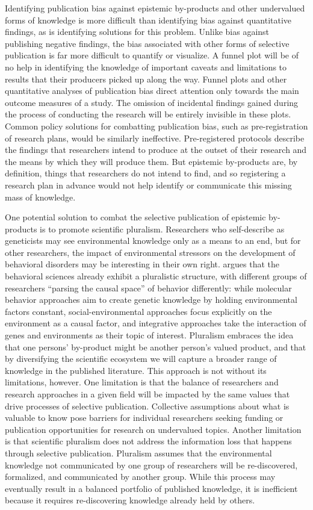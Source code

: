 \documentclass[twocolumn, serif, meta, authordate]{jote-article}
\begin{document}
Identifying publication bias against epistemic by-products and other undervalued forms of knowledge is more difficult than identifying bias against quantitative findings, as is identifying solutions for this problem. Unlike bias against publishing negative findings, the bias associated with other forms of selective publication is far more difficult to quantify or visualize. A funnel plot will be of no help in identifying the knowledge of important caveats and limitations to results that their producers picked up along the way. Funnel plots and other quantitative analyses of publication bias direct attention only towards the main outcome measures of a study. The omission of incidental findings gained during the process of conducting the research will be entirely invisible in these plots. Common policy solutions for combatting publication bias, such as pre-registration of research plans, would be similarly ineffective. Pre-registered protocols describe the findings that researchers intend to produce at the outset of their research and the means by which they will produce them. But epistemic by-products are, by definition, things that researchers do not intend to find, and so registering a research plan in advance would not help identify or communicate this missing mass of knowledge.

One potential solution to combat the selective publication of epistemic by-products is to promote scientific pluralism. Researchers who self-describe as geneticists may see environmental knowledge only as a means to an end, but for other researchers, the impact of environmental stressors on the development of behavioral disorders may be interesting in their own right. \textcite{Longino2013Studying} argues that the behavioral sciences already exhibit a pluralistic structure, with different groups of researchers ``parsing the causal space'' of behavior differently: while molecular behavior approaches aim to create genetic knowledge by holding environmental factors constant, social-environmental approaches focus explicitly on the environment as a causal factor, and integrative approaches take the interaction of genes and environments as their topic of interest. Pluralism embraces the idea that one persons' by-product might be another person's valued product, and that by diversifying the scientific ecosystem we will capture a broader range of knowledge in the published literature. This approach is not without its limitations, however. One limitation is that the balance of researchers and research approaches in a given field will be impacted by the same values that drive processes of selective publication. Collective assumptions about what is valuable to know pose barriers for individual researchers seeking funding or publication opportunities for research on undervalued topics. Another limitation is that scientific pluralism does not address the information loss that happens through selective publication. Pluralism assumes that the environmental knowledge not communicated by one group of researchers will be re-discovered, formalized, and communicated by another group. While this process may eventually result in a balanced portfolio of published knowledge, it is inefficient because it requires re-discovering knowledge already held by others.
\end{document}
